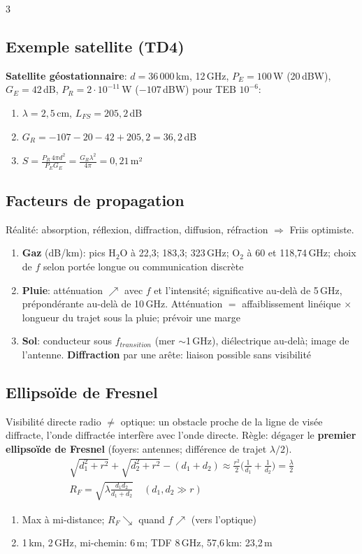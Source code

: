 \documentclass[12pt, a4paper]{article}
\begin{document}
\begin{multicols*}{3}
	\colbreak
	\subsection{Exemple satellite (TD4)}
	\textbf{Satellite géostationnaire}: $d=36\,000$\,km, 12\,GHz, $P_E=100$\,W (20\,dBW), $G_E=42$\,dB, $P_R=2\cdot10^{-11}$\,W ($-107$\,dBW) pour TEB $10^{-6}$:
	\begin{enumerate}[\roman*.]
		\item $\lambda=2{,}5$\,cm, $L_{FS}=205{,}2$\,dB
		\item $G_R=-107-20-42+205{,}2=36{,}2$\,dB
		\item $S=\frac{P_R\,4\pi d^2}{P_EG_E}=\frac{G_R\lambda^2}{4\pi}=0{,}21$\,m²
	\end{enumerate}

	\subsection{Facteurs de propagation}
	Réalité: absorption, réflexion, diffraction, diffusion, réfraction $\Rightarrow$ Friis optimiste.
	\begin{enumerate}[\roman*.]
		\item \textbf{Gaz} (dB/km): pics H$_2$O à 22,3; 183,3; 323\,GHz; O$_2$ à 60 et 118,74\,GHz; choix de $f$ selon portée longue ou communication discrète
		\item \textbf{Pluie}: atténuation $\nearrow$ avec $f$ et l'intensité; significative au-delà de 5\,GHz, prépondérante au-delà de 10\,GHz. Atténuation $=$ affaiblissement linéique $\times$ longueur du trajet sous la pluie; prévoir une marge
		\item \textbf{Sol}: conducteur sous $f_{transition}$ (mer $\sim$1\,GHz), diélectrique au-delà; image de l'antenne. \textbf{Diffraction} par une arête: liaison possible sans visibilité
	\end{enumerate}

	\subsection{Ellipsoïde de Fresnel}
	Visibilité directe radio $\neq$ optique: un obstacle proche de la ligne de visée diffracte, l'onde diffractée interfère avec l'onde directe. Règle: dégager le \textbf{premier ellipsoïde de Fresnel} (foyers: antennes; différence de trajet $\lambda/2$).
	\begin{gather*}
		\sqrt{d_1^2+r^2}+\sqrt{d_2^2+r^2}-(d_1+d_2)\approx\frac{r^2}2\Big(\frac1{d_1}+\frac1{d_2}\Big)=\frac\lambda2\\
		R_F=\sqrt{\lambda\frac{d_1d_2}{d_1+d_2}}\quad(d_1,d_2\gg r)
	\end{gather*}
	\begin{enumerate}[\roman*.]
		\item Max à mi-distance; $R_F\searrow$ quand $f\nearrow$ (vers l'optique)
		\item 1\,km, 2\,GHz, mi-chemin: 6\,m; TDF 8\,GHz, 57,6\,km: 23,2\,m
	\end{enumerate}


\end{multicols*}
\end{document}
